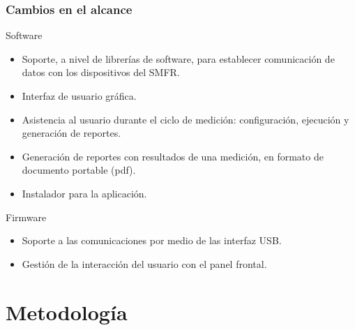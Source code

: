 \documentclass[xcolor=pdftext, table]{beamer}
\begin{document}
	\begin{frame}
		\frametitle{Cambios en el alcance}
		
		\begin{block}{Software} 
			\begin{itemize}			
				\item Soporte, a nivel de librerías de software, para establecer comunicación de datos con los dispositivos del SMFR.
				\item Interfaz de usuario gráfica.
				\item Asistencia al usuario durante el ciclo de medición: configuración, ejecución y generación de reportes.
				\item Generación de reportes con resultados de una medición, en formato de documento portable (pdf).
				\item Instalador para la aplicación.
			\end{itemize}	
		\end{block}
		
		
		\begin{block}{Firmware}
			\begin{itemize}
				\item Soporte a las comunicaciones por medio de las interfaz USB.
				\item Gestión de la interacción del usuario con el panel frontal. 	
			\end{itemize}
		\end{block}
		
	\end{frame}	

	\section{Metodología}
	
	
\end{document}
